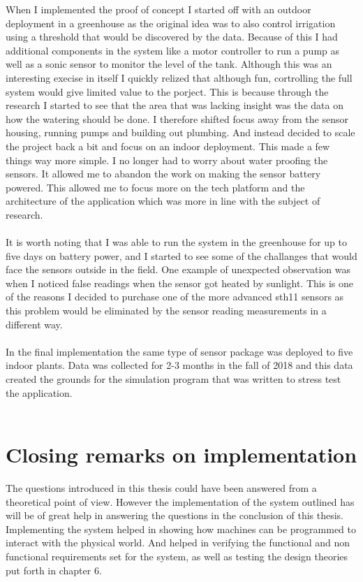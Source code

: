 \documentclass[]{uiophd}
\begin{document}
When I implemented the proof of concept I started off with an outdoor deployment in a greenhouse as the original idea was to also control irrigation using a threshold that would be discovered by the data. Because of this I had additional components in the system like a motor controller to run a pump as well as a sonic sensor to monitor the level of the tank. Although this was an interesting execise in itself I quickly relized that although fun, cortrolling the full system would give limited value to the porject. This is because through the research I started to see that the area that was lacking insight was the data on how the watering should be done. I therefore shifted focus away from the sensor housing, running pumps and building out plumbing. And instead decided to scale the project back a bit and focus on an indoor deployment. This made a few things way more simple. I no longer had to worry about water proofing the sensors. It allowed me to abandon the work on making the sensor battery powered. This allowed me to focus more on the tech platform and the architecture of the application which was more in line with the subject of research. 
\\\\
It is worth noting that I was able to run the system in the greenhouse for up to five days on battery power, and I started to see some of the challanges that would face the sensors outside in the field. One example of unexpected observation was when I noticed false readings when the sensor got heated by sunlight. This is one of the reasons I decided to purchase one of the more advanced sth11 sensors as this problem would be eliminated by the sensor reading measurements in a different way.
\\\\
In the final implementation the same type of sensor package was deployed to five indoor plants. Data was collected for 2-3 months in the fall of 2018 and this data created the grounds for the simulation program that was written to stress test the application.
\\\\
\section{Closing remarks on implementation}
The questions introduced in this thesis could have been answered from a theoretical point of view. However the implementation of the system outlined has will be of great help in answering the questions in the conclusion of this thesis. Implementing the system helped in showing how machines can be programmed to interact with the physical world. And helped in verifying the functional and non functional requirements set for the system, as well as testing the design theories put forth in chapter 6. 
\end{document}
